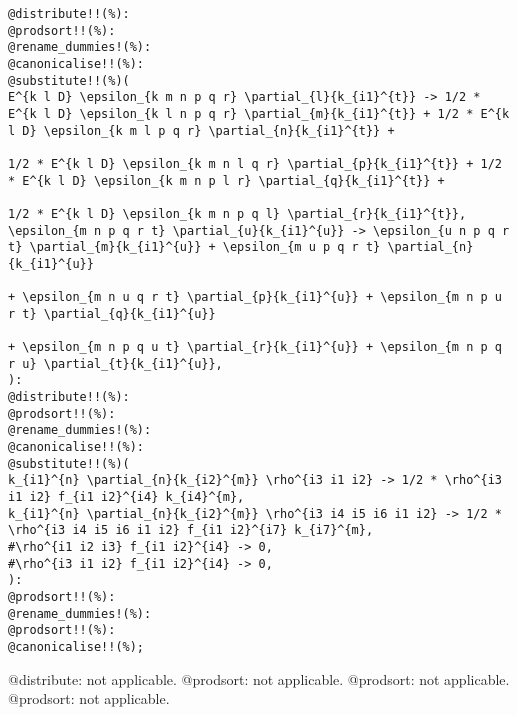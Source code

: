 \documentclass[11pt]{article}
\begin{document}
{\color[named]{Blue}\begin{verbatim}
@distribute!!(%):
@prodsort!!(%):
@rename_dummies!(%):
@canonicalise!!(%):
@substitute!!(%)(
E^{k l D} \epsilon_{k m n p q r} \partial_{l}{k_{i1}^{t}} -> 1/2 * E^{k l D} \epsilon_{k l n p q r} \partial_{m}{k_{i1}^{t}} + 1/2 * E^{k l D} \epsilon_{k m l p q r} \partial_{n}{k_{i1}^{t}} + 
                                                                               1/2 * E^{k l D} \epsilon_{k m n l q r} \partial_{p}{k_{i1}^{t}} + 1/2 * E^{k l D} \epsilon_{k m n p l r} \partial_{q}{k_{i1}^{t}} +
                                                                               1/2 * E^{k l D} \epsilon_{k m n p q l} \partial_{r}{k_{i1}^{t}},
\epsilon_{m n p q r t} \partial_{u}{k_{i1}^{u}} -> \epsilon_{u n p q r t} \partial_{m}{k_{i1}^{u}} + \epsilon_{m u p q r t} \partial_{n}{k_{i1}^{u}}
                                                                               + \epsilon_{m n u q r t} \partial_{p}{k_{i1}^{u}} + \epsilon_{m n p u r t} \partial_{q}{k_{i1}^{u}}
                                                                               + \epsilon_{m n p q u t} \partial_{r}{k_{i1}^{u}} + \epsilon_{m n p q r u} \partial_{t}{k_{i1}^{u}},
):
@distribute!!(%):
@prodsort!!(%):
@rename_dummies!(%):
@canonicalise!!(%):
@substitute!!(%)(
k_{i1}^{n} \partial_{n}{k_{i2}^{m}} \rho^{i3 i1 i2} -> 1/2 * \rho^{i3 i1 i2} f_{i1 i2}^{i4} k_{i4}^{m},
k_{i1}^{n} \partial_{n}{k_{i2}^{m}} \rho^{i3 i4 i5 i6 i1 i2} -> 1/2 * \rho^{i3 i4 i5 i6 i1 i2} f_{i1 i2}^{i7} k_{i7}^{m},
#\rho^{i1 i2 i3} f_{i1 i2}^{i4} -> 0,
#\rho^{i3 i1 i2} f_{i1 i2}^{i4} -> 0,
):
@prodsort!!(%):
@rename_dummies!(%):
@prodsort!!(%):
@canonicalise!!(%);
\end{verbatim}}
@distribute: not applicable.
@prodsort: not applicable.
@prodsort: not applicable.
@prodsort: not applicable.
\end{document}
